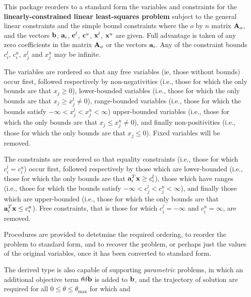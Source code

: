 \documentclass{galahad}
\begin{document}
\galheader


\galsummary
This package reorders to a standard form the variables and constraints
for the {\bf linearly-constrained linear least-squares problem}
subject to the general linear constraints
and the simple bound constraints
where the $o$ by $n$ matrix ${\mathbf{A}}_o$, and the 
vectors ${\mathbf{b}}$, ${\mathbf{a}}_{i}$, ${\mathbf{c}}^{l}$, ${\mathbf{c}}^{u}$, ${\mathbf{x}}^{l}$, 
${\mathbf{x}}^{u}$ are given.
Full advantage is taken of any zero coefficients in the matrix ${\mathbf{A}}_o$ or the
vectors ${\mathbf{a}}_{i}$. 
Any of the constraint bounds $c_{i}^{l}$, $c_{i}^{u}$, 
$x_{j}^{l}$ and $x_{j}^{u}$ may be infinite.

The variables are rordered so that any
free variables (ie, those without bounds) occur first, followed
respectively by 
non-negativities (i.e., those for which the only
bounds are that $x_j \geq 0$),
lower-bounded variables (i.e., those for which the only
bounds are that $x_j \geq x_j^l \neq 0$),
range-bounded variables (i.e., those for which the 
bounds satisfy $- \infty < x_j^l < x_j^u < \infty$)
upper-bounded variables (i.e., those for which the only
bounds are that $x_j \leq x_j^u \neq 0$), and finally
non-positivities (i.e., those for which the only
bounds are that $x_j \leq 0$).
Fixed variables will be removed. 

The constraints are reordered so that equality constraints (i.e., those
for which $c_i^l = c_i^u$) occur first, followed 
respectively by those 
which are lower-bounded (i.e., those for which the only
bounds are that ${\mathbf{a}}_i^T {\mathbf{x}} \geq c_i^l$),
those which have ranges (i.e., those for which the 
bounds satisfy 
$- \infty < c_j^l < c_j^u < \infty$), 
and finally those which are upper-bounded (i.e., those for which the only
bounds are that ${\mathbf{a}}_i^T {\mathbf{x}} \leq c_i^u$).
Free constraints, that is those for which 
$c_i^l = - \infty$ and $c_i^u = \infty$, are removed.

Procedures are provided to detetmine the required ordering, to
reorder the problem to standard form, and
to recover the problem, or perhaps just the values of
the original variables, once it has been converted to standard form.

The derived type is also capable of supporting {\em parametric}
problems, in which an additional objective
term $\theta \delta {\mathbf{b}}$ is added to ${\mathbf{b}}$, and the trajectory of 
solution are required for all $0 \leq \theta \leq \theta_{\max}$ 
for which
and 
\end{document}
